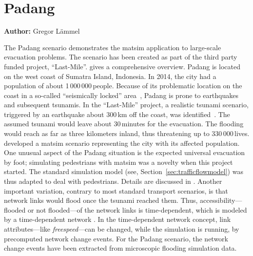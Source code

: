 \chapter{Padang}
\label{ch:padang}
\hfill \textbf{Author:} Gregor Lämmel


The Padang scenario demonstrates the \gls{matsim} application to large-scale evacuation problems. The scenario has been created as part of the third party funded project, ``Last-Mile''. \citet{00TaubenboeckEtAl2012ConcludingLastMilePaperNatHazards} gives a comprehensive overview.
Padang is located on the west coast of Sumatra Island, Indonesia. In 2014, the city had a population of about 1\,000\,000\,people. 
Because of its problematic location on the coast in a so-called ``seismically locked'' area~\citep{McCloskey2010Padang2009Earthquake}, Padang is prone to earthquakes and subsequent tsunamis. In the ``Last-Mile'' project, a realistic tsunami scenario, triggered by an earthquake about 300\,km off the coast, was identified~\citep{GosebergSchlurmann2009HazardMappingPadang}. The assumed tsunami would leave about 30\,minutes for the evacuation. The flooding would reach as far as three kilometers inland, thus threatening up to 330\,000\,lives. \citet{Laemmel_PhDThesis_2011} developed a \gls{matsim} scenario representing the city with its affected population. One unusual aspect of the Padang situation is the expected universal evacuation by foot; simulating pedestrians with \gls{matsim} was a novelty when this project started. The standard simulation model (see, \eg Section~\ref{sec:trafficflowmodel}) was thus adapted to deal with pedestrians. 
Details are discussed in \citet{00LaemmelKluepfelNagel2009EvacPadangAtBookTimmermanns}. Another important variation, contrary to most standard transport scenarios, is that network links would flood once the tsunami reached them. Thus, accessibility---flooded or not flooded---of the network links is time-dependent, which is modeled by a time-dependent network \citep{LaemmelGretherNagel2009TimeDependentNetworks}. In the time-dependent network concept, link attributes---like \emph{freespeed}---can be changed, while the simulation is running, by precomputed network change events. For the Padang scenario, the network change events have been extracted from microscopic flooding simulation data.

